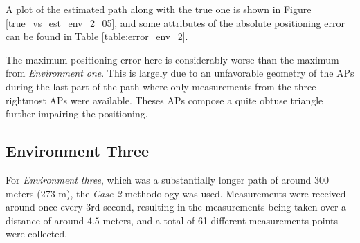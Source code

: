 \documentclass{LTHthesis}
\begin{document}
A plot of the estimated path along with the true one is shown in Figure \ref{true_vs_est_env_2_05}, and some attributes of the absolute positioning error can be found in Table \ref{table:error_env_2}.

The maximum positioning error here is considerably worse than the maximum from \emph{Environment one}. This is largely due to an unfavorable geometry of the APs during the last part of the path where only measurements from the three rightmost APs were available. Theses APs compose a quite obtuse triangle further impairing the positioning.  
%
\subsection{Environment Three}
%
For \emph{Environment three}, which was a substantially longer path of around 300 meters (273 m), the \emph{Case 2} methodology was used. Measurements were received around once every 3rd second, resulting in the measurements being taken over a distance of around $4.5$ meters, and a total of 61 different measurements points were collected. 
\end{document}
